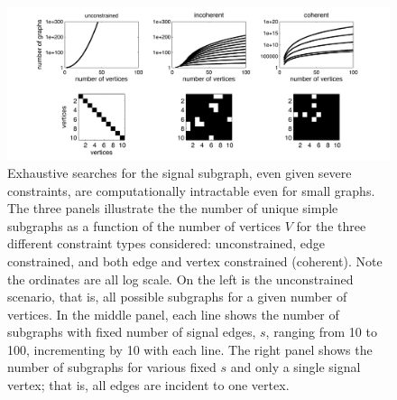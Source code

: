\documentclass[10pt,journal,cspaper,compsoc]{IEEEtran}
\begin{document}



\begin{figure}[tb!]
	\centering
		\includegraphics[width=1.0\linewidth]{../figs/num_of_graphs.pdf}
	\caption{Exhaustive searches for the signal subgraph, even given severe constraints, are computationally intractable even for small graphs.  The three panels illustrate the 
	the number of unique simple subgraphs as a function of the number of vertices $V$
	for the three different constraint types considered: unconstrained, edge constrained, and both edge and vertex constrained (coherent).  Note the ordinates are all log scale.   On the left is the unconstrained scenario, that is, all possible subgraphs for a given number of vertices.  In the middle panel, each line shows the number of subgraphs with fixed number of signal edges, $s$, ranging from 10 to 100, incrementing by 10 with each line.  The right panel shows the number of subgraphs for various fixed $s$ and only a single signal vertex; that is, all edges are incident to one vertex.  %
	}
	\label{fig:numgraphs}
\end{figure}
\end{document}
